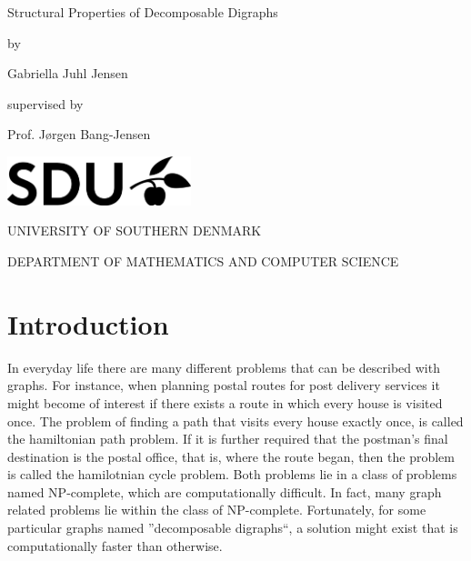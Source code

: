 \documentclass[11pt,oneside,a4paper]{report}
\begin{document}
\begin{titlepage}
	\begin{center}
		\vspace*{1cm}
		\huge{Structural Properties of Decomposable Digraphs}
		
		\vspace*{0.5cm}
		\large{by}
		
		\vspace{0.5cm}
		\Large{Gabriella Juhl Jensen}
		
		\vspace*{0.5cm}
		\normalsize{supervised by}
		
		\vspace{0.5cm}
		\large{Prof. Jørgen Bang-Jensen}
		
		\vfill
		
		\vspace*{0.7cm}
		\includegraphics[width=0.4\textwidth]{sdulogo}
		
		\vspace*{1cm}
		\MakeUppercase{University of southern Denmark}
		
		\vspace*{0.3cm}
		\MakeUppercase{Department of mathematics and computer science}
		
		\vspace*{0.3cm}
		\large{}
	\end{center}
\end{titlepage}
\tableofcontents
	\clearpage
	\section{Introduction}
	In everyday life there are many different problems that can be described with graphs.
	For instance, when planning postal routes for post delivery services it might become of interest if there exists a route in which every house is visited once.
	The problem of finding a path that visits every house exactly once, is called the hamiltonian path problem.
	If it is further required that the postman's final destination is the postal office, that is, where the route began, then the problem is called the hamilotnian cycle problem.
	Both problems lie in a class of problems named NP-complete, which are computationally difficult.
	In fact, many graph related problems lie within the class of NP-complete.
	Fortunately, for some particular graphs named ''decomposable digraphs``, a solution might exist that is computationally faster than otherwise.
	
\end{document}
